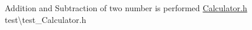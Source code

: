 Addition and Subtraction of two number is performed \mbox{\hyperlink{_calculator_8h}{Calculator.\+h}} test\textbackslash{}test\+\_\+\+Calculator.\+h 